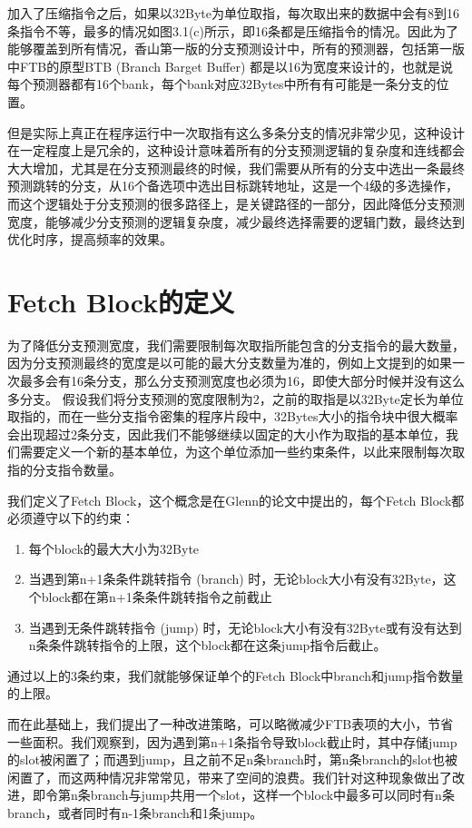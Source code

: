 加入了压缩指令之后，如果以32Byte为单位取指，每次取出来的数据中会有8到16条指令不等，最多的情况如图3.1(c)所示，即16条都是压缩指令的情况。因此为了能够覆盖到所有情况，香山第一版的分支预测设计中，所有的预测器，包括第一版中FTB的原型BTB (Branch Barget Buffer) 都是以16为宽度来设计的，也就是说每个预测器都有16个bank，每个bank对应32Bytes中所有有可能是一条分支的位置。

但是实际上真正在程序运行中一次取指有这么多条分支的情况非常少见，这种设计在一定程度上是冗余的，这种设计意味着所有的分支预测逻辑的复杂度和连线都会大大增加，尤其是在分支预测最终的时候，我们需要从所有的分支中选出一条最终预测跳转的分支，从16个备选项中选出目标跳转地址，这是一个4级的多选操作，而这个逻辑处于分支预测的很多路径上，是关键路径的一部分，因此降低分支预测宽度，能够减少分支预测的逻辑复杂度，减少最终选择需要的逻辑门数，最终达到优化时序，提高频率的效果。

\section{Fetch Block的定义}

为了降低分支预测宽度，我们需要限制每次取指所能包含的分支指令的最大数量，因为分支预测最终的宽度是以可能的最大分支数量为准的，例如上文提到的如果一次最多会有16条分支，那么分支预测宽度也必须为16，即使大部分时候并没有这么多分支。
假设我们将分支预测的宽度限制为2，之前的取指是以32Byte定长为单位取指的，而在一些分支指令密集的程序片段中，32Bytes大小的指令块中很大概率会出现超过2条分支，因此我们不能够继续以固定的大小作为取指的基本单位，我们需要定义一个新的基本单位，为这个单位添加一些约束条件，以此来限制每次取指的分支指令数量。

我们定义了Fetch Block，这个概念是在Glenn的论文中提出的，每个Fetch Block都必须遵守以下的约束：

\begin{enumerate}
    \item 每个block的最大大小为32Byte
    \item 当遇到第n+1条条件跳转指令 (branch) 时，无论block大小有没有32Byte，这个block都在第n+1条条件跳转指令之前截止
    \item 当遇到无条件跳转指令 (jump) 时，无论block大小有没有32Byte或有没有达到n条条件跳转指令的上限，这个block都在这条jump指令后截止。
\end{enumerate}

通过以上的3条约束，我们就能够保证单个的Fetch Block中branch和jump指令数量的上限。

而在此基础上，我们提出了一种改进策略，可以略微减少FTB表项的大小，节省一些面积。我们观察到，因为遇到第n+1条指令导致block截止时，其中存储jump的slot被闲置了；而遇到jump，且之前不足n条branch时，第n条branch的slot也被闲置了，而这两种情况非常常见，带来了空间的浪费。我们针对这种现象做出了改进，即令第n条branch与jump共用一个slot，这样一个block中最多可以同时有n条branch，或者同时有n-1条branch和1条jump。

